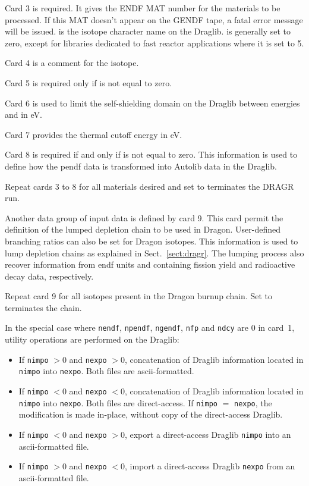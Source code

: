 Card 3 is required.  It gives the ENDF MAT number for
the materials to be processed.  If this MAT doesn't appear on
the GENDF tape, a fatal error message will be issued. 
is the isotope character name on the Draglib.  is
generally set to zero, except for libraries dedicated to fast
reactor applications where it is set to 5.

Card 4 is a comment for the isotope.

Card 5 is required only if  is not equal to zero.

Card 6 is used to limit the self-shielding domain on the Draglib between
energies  and  in eV.

Card 7 provides the thermal cutoff energy in eV.

Card 8 is required if and only if  is not equal to zero.
This information is used to define how the pendf data is transformed
into Autolib data in the Draglib.

Repeat cards 3 to 8 for all materials desired and set 
to terminates the DRAGR run.

Another data group of input data is defined by card 9. This card
permit the definition of the lumped depletion chain to be used in Dragon.
User-defined branching ratios can also be set for Dragon isotopes. This
information is used to lump depletion chains as explained in
Sect.~\ref{sect:dragr}. The lumping process also recover information from
endf units  and  containing fission yield and
radioactive decay data, respectively.

Repeat card 9 for all isotopes present in the Dragon burnup chain. Set
 to terminates the chain.

In the special case where {\tt nendf}, {\tt npendf}, {\tt ngendf}, {\tt nfp}
and {\tt ndcy} are 0 in card~1, utility operations are performed on the Draglib:
\begin{itemize}
\item If {\tt nimpo} $>0$ and {\tt nexpo} $>0$, concatenation of Draglib
information located in {\tt nimpo} into {\tt nexpo}. Both files are
ascii-formatted.
\item If {\tt nimpo} $<0$ and {\tt nexpo} $<0$, concatenation of Draglib
information located in {\tt nimpo} into {\tt nexpo}. Both files are
direct-access. If {\tt nimpo} $=$ {\tt nexpo}, the modification is made
in-place, without copy of the direct-access Draglib.
\item If {\tt nimpo} $<0$ and {\tt nexpo} $>0$, export a direct-access Draglib 
{\tt nimpo} into an ascii-formatted file.
\item If {\tt nimpo} $>0$ and {\tt nexpo} $<0$, import a direct-access Draglib
{\tt nexpo} from an ascii-formatted file.
\end{itemize}

\cleardoublepage
